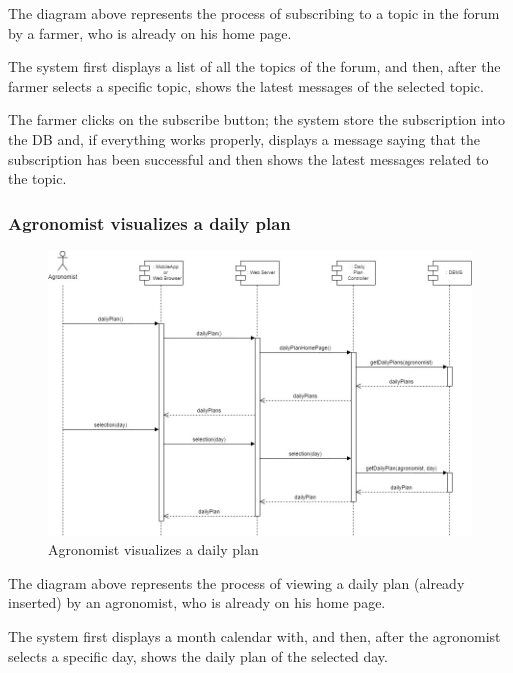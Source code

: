 \documentclass{article}
\begin{document}
        The diagram above represents the process of subscribing to a topic in the forum by a farmer, who is already on his home page. \par
        The system first displays a list of all the topics of the forum, and then, after the farmer selects a specific topic, shows the latest messages of the selected topic. \par
        The farmer clicks on the subscribe button; the system store the subscription into the DB and, if everything works properly, displays a message saying that the subscription has been successful and then shows the latest messages related to the topic. \par
    
    
    \newpage
    
    
    \subsubsection{Agronomist visualizes a daily plan}
        \begin{figure} [h]
            \centering
            \includegraphics[width=1\textwidth]{images/ArchitecturalDesign/RuntimeView/9. AgronomistVisualizeDailyPlan.jpg}
            \caption{\label{fig:agronomistVisualizeDailyPlan}Agronomist visualizes a daily plan}
        \end{figure}
        
        The diagram above represents the process of viewing a daily plan (already inserted) by an agronomist, who is already on his home page. \par
        The system first displays a month calendar with, and then, after the agronomist selects a specific day, shows the daily plan of the selected day. \par
        
\end{document}

